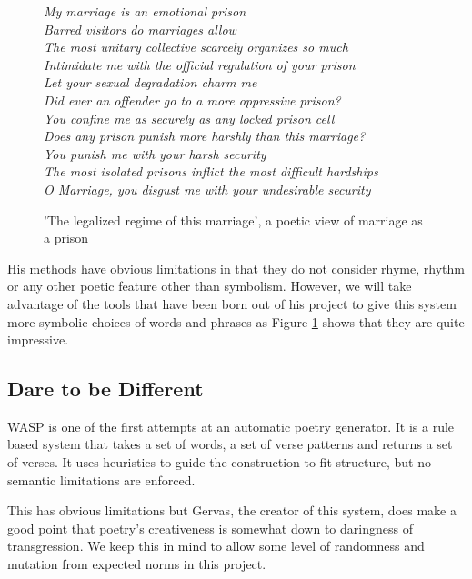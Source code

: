 \begin{figure}[h!]
\centering
\textit{
My marriage is an emotional prison\\
Barred visitors do marriages allow\\
The most unitary collective scarcely organizes so much\\
Intimidate me with the official regulation of your prison\\
Let your sexual degradation charm me\\
Did ever an offender go to a more oppressive prison?\\
You confine me as securely as any locked prison cell\\
Does any prison punish more harshly than this marriage?\\
You punish me with your harsh security\\
The most isolated prisons inflict the most difficult hardships\\
O Marriage, you disgust me with your undesirable security\\
}
\caption{'The legalized regime of this marriage', a poetic view of marriage as a prison}
\label{fig:veale}
\end{figure}

His methods have obvious limitations in that they do not consider rhyme, rhythm or any other poetic feature other than symbolism. However, we will take advantage of the tools that have been born out of his project to give this system more symbolic choices of words and phrases as Figure \ref{fig:veale} shows that they are quite impressive.

\subsection{Dare to be Different}
WASP is one of the first attempts at an automatic poetry generator. It is a rule based system that takes a set of words, a set of verse patterns and returns a set of verses\cite{gervas2000wasp}. It uses heuristics to guide the construction to fit structure, but no semantic limitations are enforced.

This has obvious limitations but Gervas, the creator of this system, does make a good point that poetry's creativeness is somewhat down to daringness of transgression. We keep this in mind to allow some level of randomness and mutation from expected norms in this project. 


